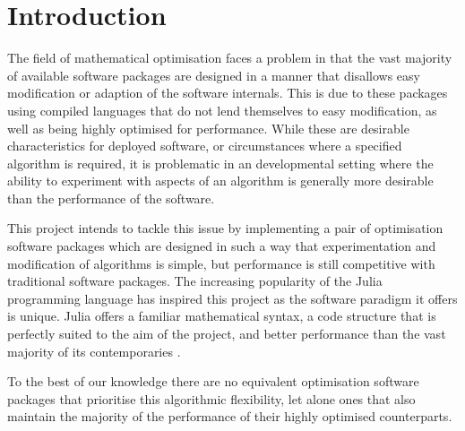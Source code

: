 \section{Introduction}\label{section_introduction}
The field of mathematical optimisation faces a problem in that the vast majority of available software packages are designed in a manner that disallows easy modification or adaption of the software internals. This is due to these packages using compiled languages that do not lend themselves to easy modification, as well as being highly optimised for performance. While these are desirable characteristics for deployed software, or circumstances where a specified algorithm is required, it is problematic in an developmental setting where the ability to experiment with aspects of an algorithm is generally more desirable than the performance of the software. 

This project intends to tackle this issue by implementing a pair of optimisation software packages which are designed in such a way that experimentation and modification of algorithms is simple, but performance is still competitive with traditional software packages. The increasing popularity of the Julia programming language \cite{Bezanson2017Julia:Computing} has inspired this project as the software paradigm it offers is unique. Julia offers a familiar mathematical syntax, a code structure that is perfectly suited to the aim of the project, and better performance than the vast majority of its contemporaries \cite{JuliaMicrobenchmarks}.

To the best of our knowledge there are no equivalent optimisation software packages that prioritise this algorithmic flexibility, let alone ones that also maintain the majority of the performance of their highly optimised counterparts. 

